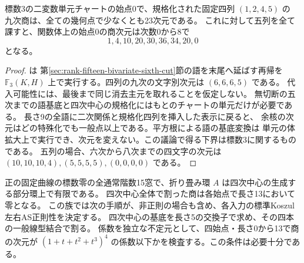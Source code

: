 \begin{proposition}\label{prop:five-center-generic-eight}
標数3の二変数単元チャートの始点0で、規格化された固定四列 $(1,2,4,5)$ の
九次商は、全ての幾何点で少なくとも23次元である。
これに対して五列を全て課すと、関数体上の始点0の商次元は次数0から8で
\[
              1,4,10,20,30,36,34,20,0
\]
となる。
\end{proposition}
\begin{proof}
 は
第\ref{sec:rank-fifteen-bivariate-sixth-cut}節の語を末尾へ延ばす再帰を
$\mathbb F_3(K,H)$ 上で実行する。四列の九次の文字別次元は $(6,6,6,5)$ である。
代入可能性には、最後まで同じ消去主元を取れることを仮定しない。
無切断の五次までの語基底と四次中心の規格化にはもとのチャートの単元だけが必要である。
長さ9の全語に二次関係と規格化四列を挿入した表示に戻ると、
余核の次元はどの特殊化でも一般点以上である。平方根による語の基底変換は
単元の体拡大上で実行でき、次元を変えない。この議論で得る下界は標数3に関するものである。
五列の場合、六次から八次までの四文字の次元は
$(10,10,10,4),(5,5,5,5),(0,0,0,0)$ である。
\end{proof}

\begin{theorem}\label{thm:ordinary-fifteen-finite-over-quartics}
正の固定曲線の標数零の全通常階数15窓で、折り畳み環 $A$ は四次中心の生成する部分環上で有限である。
四次中心全体で割った商は各始点で長さ13において零となる。
この族では次の手順が、非正則の場合も含め、各入力の標準Koszul左右AS正則性を決定する。
四次中心の基底を長さ5の交換子で求め、その四本の一般線型結合で割る。
係数を独立な不定元として、四始点・長さ0から13で商の次元が
$(1+t+t^2+t^3)^4$ の係数以下かを検査する。この条件は必要十分である。
\end{theorem}

